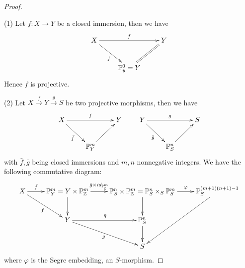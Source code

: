 \begin{proof}\
\enum
\item[(1)]Let $f: X\rightarrow Y$ be a closed immersion, then we
have
\[ \xymatrix{
   X \ar[rr]^f \ar[dr]_f & & Y         \\
   & {\mathbb{P}_y^0=Y} \ar@{=}[ur] }  \]
Hence $f$ is projective.
\item[(2)]Let $X\stackrel{f}{\rightarrow} Y\stackrel{g}{\rightarrow}
S$ be two projective morphisms, then we have
\[ \xymatrix{
   X \ar[rr]^f \ar[dr]_{\bar{f}} & & Y   \\
   & \mathbb{P}_Y^m \ar[ur] }\qquad
   \xymatrix{
   Y \ar[rr]^g \ar[dr]_{\bar{g}} & & S   \\
   & \mathbb{P}_S^n \ar[ur] }  \]
with $\bar{f}, \bar{g}$ being closed immersions and $m, n$
nonnegative integers. We have the following commutative diagram:
\[ \xymatrix{
   X \ar[r]^-{\bar{f}} \ar"2,2"_f & {\mathbb{P}_Y^m=Y\times
   \mathbb{P}_{\mathbb{Z}}^m} \ar[d] \ar[r]^-{\bar{g}\times
   id_{\mathbb{P}_{\mathbb{Z}}^m}} & {\mathbb{P}_S^n\times\mathbb{P}_{\mathbb{Z}}^m=\mathbb{P}_S^n\times_S
   \mathbb{P}_S^m} \ar[d] \ar[r]^-{\varphi} &
   {\mathbb{P}_S^{(m+1)(n+1)-1}} \ar"3,3"                   \\
   & Y \ar[r]^{\bar{g}} \ar"3,3"_g & {\mathbb{P}_S^n} \ar[d]\\
   & & S }  \]
where $\varphi$ is the Segre embedding, an $S$-morphism.


\end{proof}
